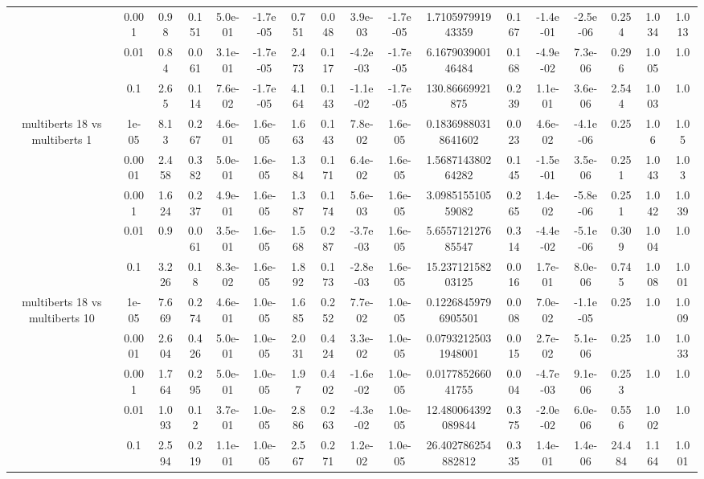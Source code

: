 \begin{tabular}{|c|c|c|c|c|c|c|c|c|c|c|c|c|c|c|c|c|}
 & 0.001 & 0.98 & 0.151 & 5.0e-01 & -1.7e-05 & 0.751 & 0.048 & 3.9e-03 & -1.7e-05 & 1.710597991943359 & 0.167 & -1.4e-01 & -2.5e-06 & 0.254 & 1.034 & 1.013 \\
 & 0.01 & 0.84 & 0.061 & 3.1e-01 & -1.7e-05 & 2.473 & 0.117 & -4.2e-03 & -1.7e-05 & 6.167903900146484 & 0.168 & -4.9e-02 & 7.3e-06 & 0.296 & 1.005 & 1.0 \\
 & 0.1 & 2.65 & 0.114 & 7.6e-02 & -1.7e-05 & 4.164 & 0.143 & -1.1e-02 & -1.7e-05 & 130.86669921875 & 0.239 & 1.1e-01 & 3.6e-06 & 2.544 & 1.003 & 1.0 \\
\hline
\multirow{5}{*}{multiberts 18 vs multiberts 1} & 1e-05 & 8.13 & 0.267 & 4.6e-01 & 1.6e-05 & 1.663 & 0.143 & 7.8e-02 & 1.6e-05 & 0.18369880318641602 & 0.023 & 4.6e-02 & -4.1e-06 & 0.25 & 1.06 & 1.05 \\
 & 0.0001 & 2.458 & 0.382 & 5.0e-01 & 1.6e-05 & 1.384 & 0.171 & 6.4e-02 & 1.6e-05 & 1.568714380264282 & 0.145 & -1.5e-01 & 3.5e-06 & 0.251 & 1.043 & 1.03 \\
 & 0.001 & 1.624 & 0.237 & 4.9e-01 & 1.6e-05 & 1.387 & 0.174 & 5.6e-03 & 1.6e-05 & 3.098515510559082 & 0.265 & 1.4e-02 & -5.8e-06 & 0.251 & 1.042 & 1.039 \\
 & 0.01 & 0.9 & 0.061 & 3.5e-01 & 1.6e-05 & 1.568 & 0.287 & -3.7e-03 & 1.6e-05 & 5.655712127685547 & 0.314 & -4.4e-02 & -5.1e-06 & 0.309 & 1.004 & 1.0 \\
 & 0.1 & 3.226 & 0.18 & 8.3e-02 & 1.6e-05 & 1.892 & 0.173 & -2.8e-03 & 1.6e-05 & 15.23712158203125 & 0.016 & 1.7e-01 & 8.0e-06 & 0.745 & 1.008 & 1.001 \\
\hline
\multirow{5}{*}{multiberts 18 vs multiberts 10} & 1e-05 & 7.669 & 0.274 & 4.6e-01 & 1.0e-05 & 1.685 & 0.252 & 7.7e-02 & 1.0e-05 & 0.12268459796905501 & 0.008 & 7.0e-02 & -1.1e-05 & 0.25 & 1.0 & 1.009 \\
 & 0.0001 & 2.604 & 0.426 & 5.0e-01 & 1.0e-05 & 2.031 & 0.424 & 3.3e-02 & 1.0e-05 & 0.07932125031948001 & 0.015 & 2.7e-02 & 5.1e-06 & 0.25 & 1.0 & 1.033 \\
 & 0.001 & 1.764 & 0.295 & 5.0e-01 & 1.0e-05 & 1.97 & 0.402 & -1.6e-02 & 1.0e-05 & 0.017785266041755 & 0.004 & -4.7e-03 & 9.1e-06 & 0.253 & 1.0 & 1.0 \\
 & 0.01 & 1.093 & 0.12 & 3.7e-01 & 1.0e-05 & 2.886 & 0.263 & -4.3e-02 & 1.0e-05 & 12.480064392089844 & 0.375 & -2.0e-02 & 6.0e-06 & 0.556 & 1.002 & 1.0 \\
 & 0.1 & 2.594 & 0.219 & 1.1e-01 & 1.0e-05 & 2.567 & 0.271 & 1.2e-02 & 1.0e-05 & 26.402786254882812 & 0.335 & 1.4e-01 & 1.4e-06 & 24.484 & 1.164 & 1.001 \\

\end{tabular}
